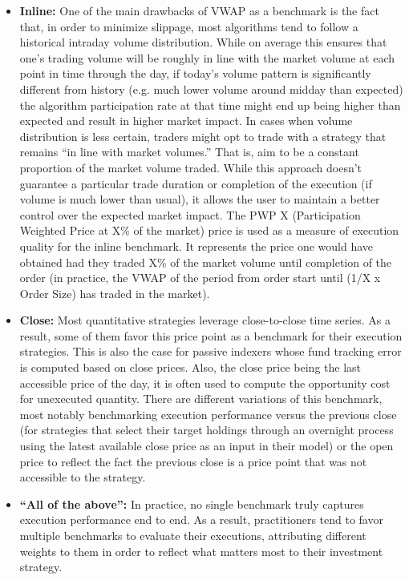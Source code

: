 \begin{itemize}
\item \textbf{Inline:} One of the main drawbacks of VWAP as a benchmark is the fact that, in order to minimize slippage, most algorithms tend to follow a historical intraday volume distribution. While on average this ensures that one's trading volume will be roughly in line with the market volume at each point in time through the day, if today's volume pattern is significantly different from history (e.g. much lower volume around midday than expected) the algorithm participation rate at that time might end up being higher than expected and result in higher market impact. In cases when volume distribution is less certain, traders might opt to trade with a strategy that remains ``in line with market volumes.'' That is, aim to be a constant proportion of the market volume traded. While this approach doesn't guarantee a particular trade duration or completion of the execution (if volume is much lower than usual), it allows the user to maintain a better control over the expected market impact. The PWP X (Participation Weighted Price at X\% of the market) price is used as a measure of execution quality for the inline benchmark. It represents the price one would have obtained had they traded X\% of the market volume until completion of the order (in practice, the VWAP of the period from order start until (1/X x Order Size) has traded in the market).

\item \textbf{Close:} Most quantitative strategies leverage close-to-close time series. As a result, some of them favor this price point as a benchmark for their execution strategies. This is also the case for passive indexers whose fund tracking error is computed based on close prices. Also, the close price being the last accessible price of the day, it is often used to compute the opportunity cost for unexecuted quantity. 
There are different variations of this benchmark, most notably benchmarking execution performance versus the previous close (for strategies that select their target holdings through an overnight process using the latest available close price as an input in their model) or the open price to reflect the fact the previous close is a price point that was not accessible to the strategy.

\item \textbf{``All of the above'':} In practice, no single benchmark truly captures execution performance end to end. As a result, practitioners tend to favor multiple benchmarks to evaluate their executions, attributing different weights to them in order to reflect what matters most to their investment strategy.
\end{itemize}





